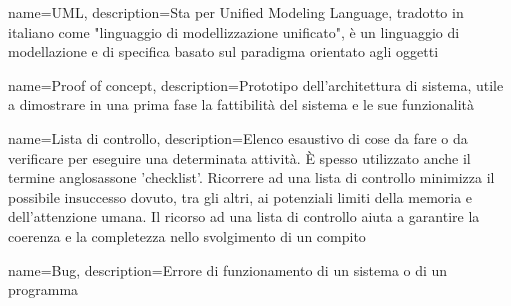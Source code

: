{
	name={UML},
	description={Sta per Unified Modeling Language, tradotto in italiano come "linguaggio di modellizzazione unificato", è un linguaggio di modellazione e di specifica basato sul paradigma orientato agli oggetti}
}

{
	name={Proof of concept},
	description={Prototipo dell'architettura di sistema, utile a dimostrare in una prima fase la fattibilità del sistema e le sue funzionalità}
}

{
	name={Lista di controllo},
	description={Elenco esaustivo di cose da fare o da verificare per eseguire una determinata attività. È spesso utilizzato anche il termine anglosassone 'checklist'. Ricorrere ad una lista di controllo minimizza il possibile insuccesso dovuto, tra gli altri, ai potenziali limiti della memoria e dell'attenzione umana. Il ricorso ad una lista di controllo aiuta a garantire la coerenza e la completezza nello svolgimento di un compito}
}

{
	name={Bug},
	description={Errore di funzionamento di un sistema o di un programma}
}